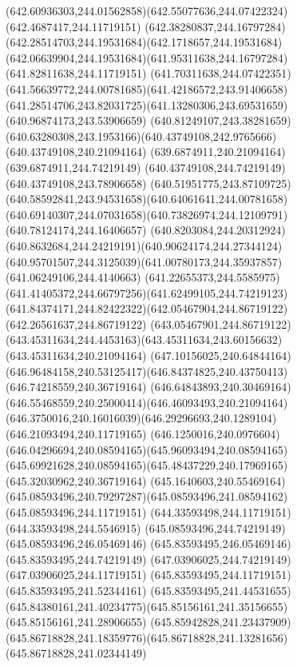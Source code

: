 {{	\curveto(642.60936303,244.01562858)(642.55077636,244.07422324)(642.4687417,244.11719151)
	\curveto(642.38280837,244.16797284)(642.28514703,244.19531684)(642.1718657,244.19531684)
	\curveto(642.06639904,244.19531684)(641.95311638,244.16797284)(641.82811638,244.11719151)
	\curveto(641.70311638,244.07422351)(641.56639772,244.00781685)(641.42186572,243.91406658)
	\curveto(641.28514706,243.82031725)(641.13280306,243.69531659)(640.96874173,243.53906659)
	\curveto(640.81249107,243.38281659)(640.63280308,243.1953166)(640.43749108,242.9765666)
	\lineto(640.43749108,240.21094164)
	\lineto(639.6874911,240.21094164)
	\lineto(639.6874911,244.74219149)
	\lineto(640.43749108,244.74219149)
	\lineto(640.43749108,243.78906658)
	\curveto(640.51951775,243.87109725)(640.58592841,243.94531658)(640.64061641,244.00781658)
	\curveto(640.69140307,244.07031658)(640.73826974,244.12109791)(640.78124174,244.16406657)
	\curveto(640.8203084,244.20312924)(640.8632684,244.24219191)(640.90624174,244.27344124)
	\curveto(640.95701507,244.3125039)(641.00780173,244.35937857)(641.06249106,244.4140663)
	\curveto(641.22655373,244.5585975)(641.41405372,244.66797256)(641.62499105,244.74219123)
	\curveto(641.84374171,244.82422322)(642.05467904,244.86719122)(642.26561637,244.86719122)
	\curveto(643.05467901,244.86719122)(643.45311634,244.4453163)(643.45311634,243.60156632)
	\lineto(643.45311634,240.21094164)
	\closepath
	\moveto(647.10156025,240.64844164)
	\curveto(646.96484158,240.53125417)(646.84374825,240.43750413)(646.74218559,240.36719164)
	\curveto(646.64843893,240.30469164)(646.55468559,240.25000414)(646.46093493,240.21094164)
	\curveto(646.3750016,240.16016039)(646.29296693,240.1289104)(646.21093494,240.11719165)
	\curveto(646.1250016,240.0976604)(646.04296694,240.08594165)(645.96093494,240.08594165)
	\curveto(645.69921628,240.08594165)(645.48437229,240.17969165)(645.32030962,240.36719164)
	\curveto(645.1640603,240.55469164)(645.08593496,240.79297287)(645.08593496,241.08594162)
	\lineto(645.08593496,244.11719151)
	\lineto(644.33593498,244.11719151)
	\lineto(644.33593498,244.5546915)
	\lineto(645.08593496,244.74219149)
	\lineto(645.08593496,246.05469146)
	\lineto(645.83593495,246.05469146)
	\lineto(645.83593495,244.74219149)
	\lineto(647.03906025,244.74219149)
	\lineto(647.03906025,244.11719151)
	\lineto(645.83593495,244.11719151)
	\lineto(645.83593495,241.52344161)
	\lineto(645.83593495,241.44531655)
	\curveto(645.84380161,241.40234775)(645.85156161,241.35156655)(645.85156161,241.28906655)
	\curveto(645.85942828,241.23437909)(645.86718828,241.18359776)(645.86718828,241.13281656)
	\lineto(645.86718828,241.02344149)
}}
